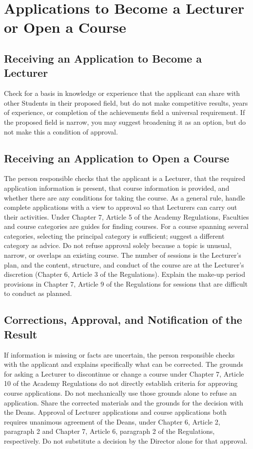 \newpage
\chapter{Applications to Become a Lecturer or Open a Course}

\section{Receiving an Application to Become a Lecturer}

Check for a basis in knowledge or experience that the applicant can share with other Students in their proposed field, but do not make competitive results, years of experience, or completion of the achievements field a universal requirement.
If the proposed field is narrow, you may suggest broadening it as an option, but do not make this a condition of approval.

\section{Receiving an Application to Open a Course}

The person responsible checks that the applicant is a Lecturer, that the required application information is present, that course information is provided, and whether there are any conditions for taking the course.
As a general rule, handle complete applications with a view to approval so that Lecturers can carry out their activities.
Under Chapter 7, Article 5 of the Academy Regulations, Faculties and course categories are guides for finding courses.
For a course spanning several categories, selecting the principal category is sufficient; suggest a different category as advice.
Do not refuse approval solely because a topic is unusual, narrow, or overlaps an existing course.
The number of sessions is the Lecturer's plan, and the content, structure, and conduct of the course are at the Lecturer's discretion (Chapter 6, Article 3 of the Regulations).
Explain the make-up period provisions in Chapter 7, Article 9 of the Regulations for sessions that are difficult to conduct as planned.

\section{Corrections, Approval, and Notification of the Result}

If information is missing or facts are uncertain, the person responsible checks with the applicant and explains specifically what can be corrected.
The grounds for asking a Lecturer to discontinue or change a course under Chapter 7, Article 10 of the Academy Regulations do not directly establish criteria for approving course applications. Do not mechanically use those grounds alone to refuse an application.
Share the corrected materials and the grounds for the decision with the Deans. Approval of Lecturer applications and course applications both requires unanimous agreement of the Deans, under Chapter 6, Article 2, paragraph 2 and Chapter 7, Article 6, paragraph 2 of the Regulations, respectively.
Do not substitute a decision by the Director alone for that approval.


